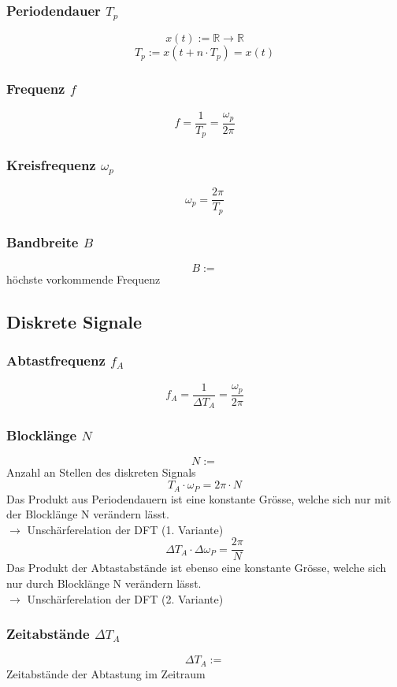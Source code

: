 \documentclass[12pt,a4paper]{scrartcl}
\begin{document}
\subsubsection{Periodendauer $T_p$}
\label{sec:sub:sub:periodendauer}
$$ x(t) := \mathbb{R} \to \mathbb{R}$$
$$T_p := x(t + n \cdot T_p) = x(t)$$
\subsubsection{Frequenz $f$}
\label{sec:sub:sub:frequenz}
$$f = \frac{1}{T_p} = \frac{\omega_p}{2\pi}$$
\subsubsection{Kreisfrequenz $\omega_p$}
\label{sec:sub:sub:periodendauer-im-spektrum-kreisfrequenz}
$$\omega_p = \frac{2\pi}{T_p}$$
\subsubsection{Bandbreite $B$}
\label{sec:sub:sub:bandbreite}
$$B :=$$ höchste vorkommende Frequenz

\subsection{Diskrete Signale}
\label{sec:sub:const-def-diskrete-signale}

\subsubsection{Abtastfrequenz $f_A$}
\label{sec:sub:sub:abtastfrequenz}
$$f_A = \frac{1}{\Delta T_A} = \frac{\omega_p}{2\pi}$$

\subsubsection{Blocklänge $N$}
\label{sec:sub:sub:blocklaenge}
$$N :=$$ Anzahl an Stellen des diskreten Signals
$$T_A \cdot \omega_P = 2\pi \cdot N$$ Das Produkt aus Periodendauern ist eine konstante Grösse, welche sich nur mit der Blocklänge N verändern lässt.\\
$\to$ Unschärferelation der DFT (1. Variante)
$$\Delta T_A \cdot \Delta \omega_P = \frac{2\pi}{N}$$ Das Produkt der Abtastabstände ist ebenso eine konstante Grösse, welche sich nur durch Blocklänge N verändern lässt.\\
$\to$ Unschärferelation der DFT (2. Variante)

\subsubsection{Zeitabstände $\Delta T_A$}
\label{sec:sub:sub:delta-t-a}
$$\Delta T_A :=$$ Zeitabstände der Abtastung im Zeitraum
\end{document}
